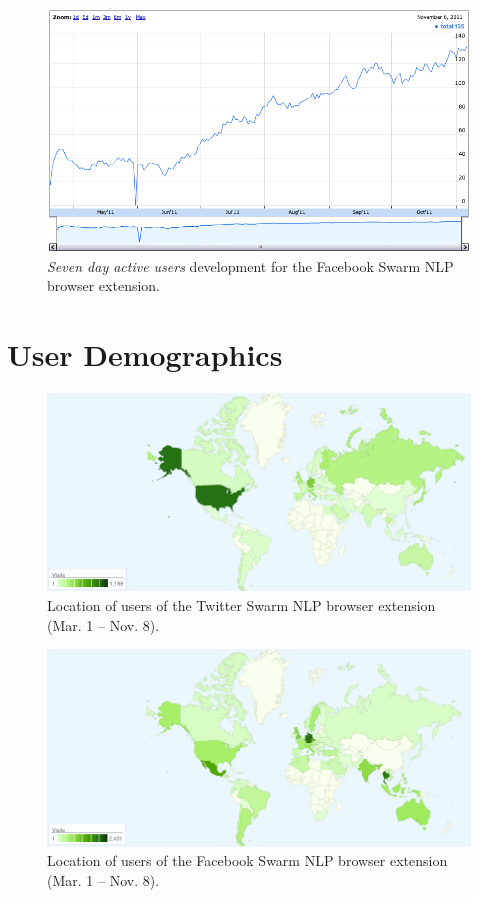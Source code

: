 \documentclass{iosart2c}
\begin{document}
\begin{figure}
\centering
\includegraphics[width=1.0\linewidth]{./resources/facebookswarmnlpstats.png}
\caption{\textit{Seven day active users} development for the Facebook Swarm NLP browser extension.}
\label{fig:facebookswarmnlpstats}
\end{figure}

\section{User Demographics} \label{sec:userdemographics}
\begin{figure}
\centering
\includegraphics[width=1.0\linewidth]{./resources/twitterlocation.png}
\caption{Location of users of the Twitter Swarm NLP browser extension (Mar. 1 -- Nov. 8).}
\label{fig:twitterlocation}
\end{figure}

\begin{figure}
\centering
\includegraphics[width=1.0\linewidth]{./resources/facebooklocation.png}
\caption{Location of users of the Facebook Swarm NLP browser extension (Mar. 1 -- Nov. 8).}
\label{fig:facebooklocation}
\end{figure}
\end{document}
